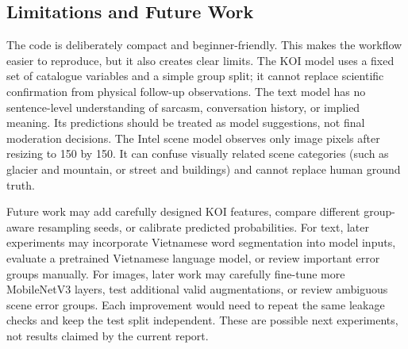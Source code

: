 \documentclass[oneside]{hcmut-report}
\begin{document}
\subsection{Limitations and Future Work}

The code is deliberately compact and beginner-friendly. This makes the workflow easier to reproduce, but it also creates clear limits. The KOI model uses a fixed set of catalogue variables and a simple group split; it cannot replace scientific confirmation from physical follow-up observations. The text model has no sentence-level understanding of sarcasm, conversation history, or implied meaning. Its predictions should be treated as model suggestions, not final moderation decisions. The Intel scene model observes only image pixels after resizing to 150 by 150. It can confuse visually related scene categories (such as glacier and mountain, or street and buildings) and cannot replace human ground truth.

Future work may add carefully designed KOI features, compare different group-aware resampling seeds, or calibrate predicted probabilities. For text, later experiments may incorporate Vietnamese word segmentation into model inputs, evaluate a pretrained Vietnamese language model, or review important error groups manually. For images, later work may carefully fine-tune more MobileNetV3 layers, test additional valid augmentations, or review ambiguous scene error groups. Each improvement would need to repeat the same leakage checks and keep the test split independent. These are possible next experiments, not results claimed by the current report.
\end{document}
